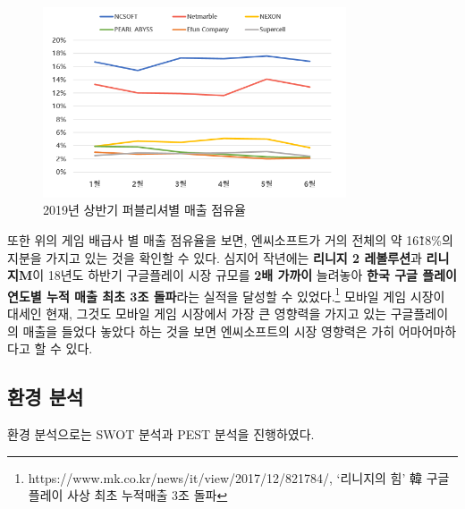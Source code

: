 \documentclass[11pt]{oblivoir}
\begin{document}
		 \begin{figure}[htbp]
		 	\centering
		 	\includegraphics[width=0.8\textwidth]{Pictures/PublisherMaechul.png}
		 	\caption{2019년 상반기 퍼블리셔별 매출 점유율}
		 \end{figure}
	 
	 	또한 위의 게임 배급사 별 매출 점유율을 보면, 엔씨소프트가 거의 전체의 약 16\~18\%의 지분을 가지고 있는 것을 확인할 수 있다. 심지어 작년에는 \textbf{리니지 2 레볼루션}과 
	 	\textbf{리니지M}이 18년도 하반기 구글플레이 시장 규모를 \textbf{2배 가까이} 늘려놓아 \textbf{한국 구글 플레이 연도별 누적 매출 최초 3조 돌파}라는 실적을 달성할 수 있었다.\footnote{https://www.mk.co.kr/news/it/view/2017/12/821784/, ‘리니지의 힘’ 韓 구글 플레이 사상 최초 누적매출 3조 돌파} 모바일 게임 시장이 대세인 현재, 그것도 모바일 게임 시장에서 가장 큰 영향력을 가지고 있는 구글플레이의 매출을 들었다 놓았다 하는 것을 보면 엔씨소프트의 시장 영향력은 가히 어마어마하다고 할 수 있다. 
	 	\pagebreak
		\subsection{환경 분석}
		
		환경 분석으로는 SWOT 분석과 PEST 분석을 진행하였다. 
		
\end{document}
